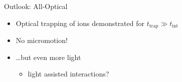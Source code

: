 \begin{frame}[t]{Outlook: All-Optical}
    \begin{itemize}
        \item Optical trapping of ions demonstrated for $t_{\mathrm{trap}} \gg t_{\mathrm{int}}$
        \vspace{0.5cm}
        \item No micromotion!
        \vspace{0.5cm}
        \item \ldots but even more light
            \begin{itemize}
                \item[\textrightarrow] light assisted interactions?
            \end{itemize}
    \end{itemize}
\end{frame}

